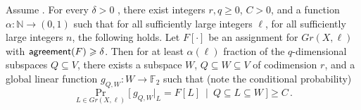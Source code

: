 \documentclass{toc}
\newcommand\bProb[2]{{\Pr_{#1}\big[ {#2} \big]}}
\newcommand*\aconj[1]{\alpha{#1}}
\renewcommand\geq{\geqslant}
\renewcommand\ge{\geqslant}
\def\F{\mathbb{F}}
\def\agr{{\sf agreement}}
\begin{document}
\begin{lemma}\label{lemma:corr_main}
  Assume . For every %
   $\delta > 0$ ,
  there exist integers $r,q \geq 0$, %
   $C > 0$, and a function $\alpha\colon\mathbb{N}\to(0,1)$ such that for
  all sufficiently large integers $\ell$, for all sufficiently large
  integers $n$, the following holds.  Let $F[\cdot]$ be an assignment
  for $Gr(X,\ell)$ with $\agr(F)\ge \delta$.  Then for at least
  $\aconj{(\ell)}$ fraction of the $q$-dimensional subspaces
  $Q \subseteq V$, there exists a subspace $W$,
  $Q \subseteq W \subseteq V$ of codimension $r$, and a global linear
  function $g_{Q,W}: W \to \F_2$ such that (note the conditional
  probability)
  \begin{equation*} %
  \bProb{L \in Gr(X, \ell)}{~g_{Q,W}|_L = F[L]  ~\mid ~ Q \subseteq L \subseteq W~}\geqslant C\,.
  \end{equation*}
\end{lemma}
\end{document}
